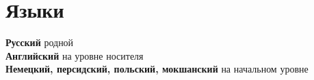 \documentclass[11pt]{article} %
\begin{document}
\section*{Языки}

\textbf{Русский} родной\\
\textbf{Английский} на уровне носителя\\
\textbf{Немецкий, персидский, польский, мокшанский} на начальном уровне




\end{document}
